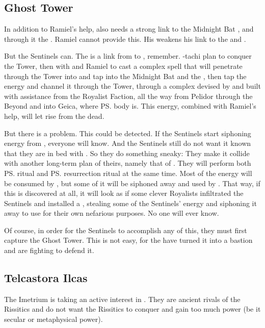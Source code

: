 \subsection{Ghost Tower}
In addition to Ramiel's help, \Shiaraid{} also needs a strong link to the Midnight Bat \matrix, and through it the \Erebean{} \dweomer. 
Ramiel cannot provide this. 
His \kenosis{} weakens his link to the \matrix{} and \dweomer. 

But the Sentinels can. 
The  is a link from \Azmith{} to \Nyx, remember. 
\Secherdamon-tachi plan to conquer the Tower, then \cooperate{} with \Shiaraid{} and Ramiel to cast a complex spell that will penetrate through the Tower into \Nyx{} and tap into the Midnight Bat and the \dweomer, then tap the energy and channel it through the Tower, through a complex  devised by \Vizsherioch{} and built with assistance from the Royalist Faction, all the way from Pelidor through the Beyond and into Geica, where \ps{\Belzir} body is. 
This energy, combined with Ramiel's help, will let \Shiaraid{} rise from the dead. 

But there is a problem. 
This could be detected. 
If the Sentinels start siphoning energy from \Nyx, everyone will know. 
And the Sentinels still do not want it known that they are in bed with \Shiaraid. 
So they do something sneaky: 
They make it collide with another long-term plan of theirs, namely that of . 
They will perform both \ps{\Vizsherioch} \shaeeroth{} ritual and \ps{\Shiaraid} resurrection ritual at the same time. 
Most of the energy will be consumed by \Vizsherioch, but some of it will be siphoned away and used by \Shiaraid. 
That way, if this is discovered at all, it will look as if some clever Royalists infiltrated the Sentinels and installed a , stealing some of the Sentinels' energy and siphoning it away to use for their own nefarious purposes. 
No one will ever know. 

Of course, in order for the Sentinels to accomplish any of this, they must first capture the Ghost Tower. 
This is not easy, for the \resphain{} have turned it into a bastion and are fighting to defend it. 






\subsection{Telcastora Ilcas}
The Imetrium is taking an active interest in \Velcad. 
They are ancient rivals of the Rissitics and do not want the Rissitics to conquer and gain too much power (be it secular or metaphysical power). 

